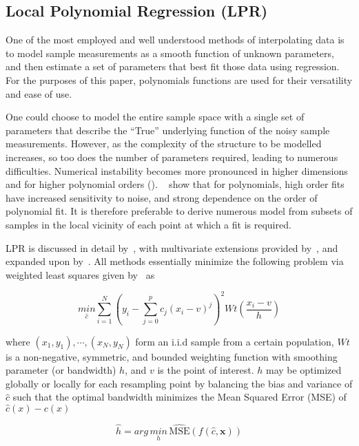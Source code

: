 \subsection{Local Polynomial Regression (LPR)}\label{subsec:LPR}

One of the most employed and well understood methods of interpolating data is
to model sample measurements as a smooth function of unknown parameters, and
then estimate a set of parameters that best fit those data using regression.
For the purposes of this paper, polynomials functions are used for their
versatility and ease of use.

One could choose to model the entire sample space with a single set of
parameters that describe the ``True'' underlying function of the noisy sample
measurements.
However, as the complexity of the structure to be modelled increases, so too
does the number of parameters required, leading to numerous difficulties.
Numerical instability becomes more pronounced in higher dimensions and for
higher polynomial orders (\citet{Noferini2016}).
~\citet{Gelman19} show that for polynomials, high order fits have increased
sensitivity to noise, and strong dependence on the order of polynomial fit.
It is therefore preferable to derive numerous model from subsets of samples in
the local vicinity of each point at which a fit is required.

LPR is discussed in detail by~\citep{Fan96a}, with multivariate extensions
provided by~\citep{Masry1996}, and expanded upon by~\citep{Gu15}.
All methods essentially minimize the following problem via weighted least
squares given by~\citep{Fan96b} as

\begin{equation}
       \underset{\hat{c}}{min} \sum_{i=1}^{N}{
       \left( y_i - \sum_{j=0}^{p}{c_j (x_i - v)^j}\right)^2}
       Wt(\frac{x_i - v}{h})
       \label{eq:equation70}
\end{equation}

where $(x_1, y_1), \cdots,(x_N, y_N)$ form an i.i.d sample from a certain
population, $Wt$ is a non-negative, symmetric, and bounded weighting function
with smoothing parameter (or bandwidth) $h$, and $v$ is the point of interest.
$h$ may be optimized globally or locally for each resampling point by balancing
the bias and variance of $\hat{c}$ such that the optimal bandwidth minimizes
the Mean Squared Error (MSE) of $\hat{c}(x) - c(x)$

\begin{equation}
       \hat{h} = arg\, \underset{h}{min}\, \hat{\text{MSE}}(f(\hat{c}, \bm{x}))
       \label{eq:equation69}
\end{equation}

